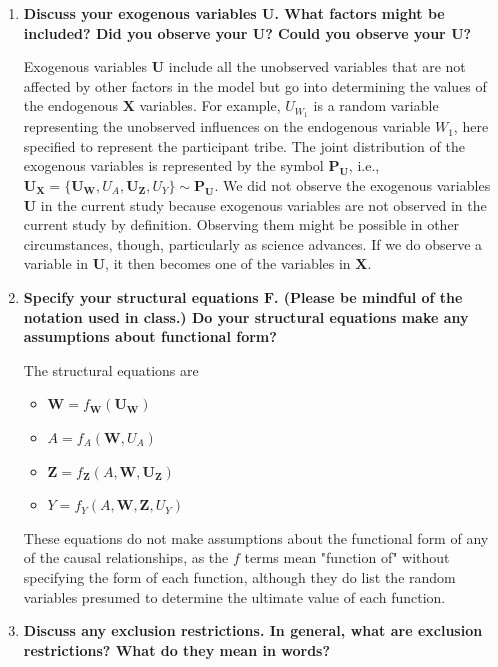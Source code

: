 \documentclass{article}
\begin{document}
\begin{enumerate}[label=\textbf{(\alph*)}]
  \item \textbf{Discuss your exogenous variables $\bm{U}$. What factors might be included? Did you observe your $\bm{U}$? Could you observe your $\bm{U}$?}
  
  Exogenous variables $\bm{U}$ include all the unobserved variables that are not affected by other factors in the model but go into determining the values of the endogenous $\bm{X}$ variables. For example, $U_{W_1}$ is a random variable representing the unobserved influences on the endogenous variable $W_1$, here specified to represent the participant tribe. The joint distribution of the exogenous variables is represented by the symbol $\bm{P_U}$, i.e., $\bm{U_X} = \{\bm{U_W}, U_A, \bm{U_Z}, U_Y\} \sim \bm{P_U}$. We did not observe the exogenous variables $\bm{U}$ in the current study because exogenous variables are not observed in the current study by definition. Observing them might be possible in other circumstances, though, particularly as science advances. If we do observe a variable in $\bm{U}$, it then becomes one of the variables in $\bm{X}$.
  
  \item \textbf{Specify your structural equations $\bm{F}$. (Please be mindful of the notation used in class.) Do your structural equations make any assumptions about functional form?}
  
  The structural equations are

  \begin{itemize}
  
    \item $\bm{W} = f_{\bm{W}} (\bm{U_W})$
    \item $A = f_{A}(\bm{W}, U_{A})$
    \item $\bm{Z} = f_{\bm{Z}}(A, \bm{W}, \bm{U_Z})$
    \item $Y = f_Y(A, \bm{W}, \bm{Z}, U_Y)$
  
  \end{itemize}

  These equations do not make assumptions about the functional form of any of the causal relationships, as the $f$ terms mean "function of" without specifying the form of each function, although they do list the random variables presumed to determine the ultimate value of each function.
 
  \item \textbf{Discuss any exclusion restrictions. In general, what are exclusion restrictions? What do they mean in words?}
  

\end{enumerate}
\end{document}
